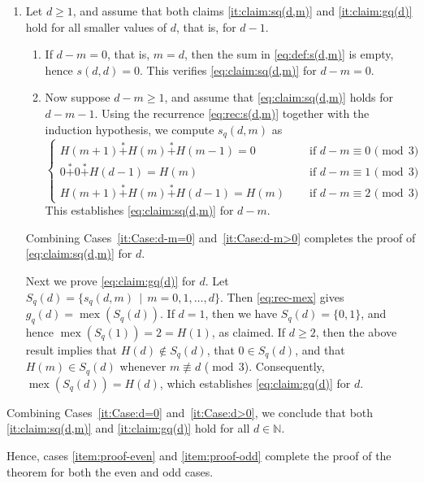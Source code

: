 \documentclass[a4paper,11pt]{amsart}
\theoremstyle{definition}
\newenvironment{demo}[1]{%
  \trivlist
  \item[\hskip\labelsep
        {\bf #1.}]
}{%
\hfill\qedsymbol
  \endtrivlist
}
\newcommand{\mex}{\operatorname{mex}}
\newcommand{\nimadd}{\overset{*}{+}}
\numberwithin{equation}{section}
\def\Non{\mathbb{N}}
\def\MOD{\operatorname{mod}}
\begin{document}
\begin{demo}{Proof of Theorem~\ref{th:Grundy-subsFF-ruler}}
\begin{enumerate}[leftmargin=14pt,label=(\roman*)]
\begin{enumerate}[label=\Roman*)]
%
Moreover, $g_{q}(0)=\mex\{s_{q}(0,0)\}=1$.
Therefore, both claims \ref{it:claim:sq(d,m)} and \ref{it:claim:gq(d)} hold for $d=0$.
%
%
\item\label{it:Case:d>0}
%
Let $d\geq1$,
and assume that both claims \ref{it:claim:sq(d,m)} and \ref{it:claim:gq(d)} 
hold for all smaller values of $d$, that is, for $d-1$.
%
\begin{enumerate}[label=\roman*)]
%
\item\label{it:Case:d-m=0}
%
If $d-m=0$, that is, $m=d$, then the sum in \eqref{eq:def:s(d,m)} is empty, hence $s(d,d)=0$.
This verifies \eqref{eq:claim:sq(d,m)} for $d-m=0$.
%
\item\label{it:Case:d-m>0}
%
Now suppose $d-m\geq1$, and assume that \eqref{eq:claim:sq(d,m)} holds for $d-m-1$.
%
Using the recurrence \eqref{eq:rec:s(d,m)} together with the induction hypothesis,
we compute $s_{q}(d,m)$ as
%
\begin{equation*}
\begin{cases}
H(m+1)\nimadd H(m)\nimadd H(m-1)=0\quad&\text{ if $d-m \equiv 0$ ($\MOD\,3$)}\\
0\nimadd 0\nimadd H(d-1)=H(m)\quad&\text{ if $d-m \equiv 1$ ($\MOD\,3$)}\\
H(m+1)\nimadd H(m)\nimadd H(d-1)=H(m)\quad&\text{ if $d-m \equiv 2$ ($\MOD\,3$)}
\end{cases}
\end{equation*}
%
This establishes \eqref{eq:claim:sq(d,m)} for $d-m$.
%
\end{enumerate}
%
Combining Cases~\ref{it:Case:d-m=0} and~\ref{it:Case:d-m>0} completes the proof of \eqref{eq:claim:sq(d,m)} for $d$.
%
\par
%
Next we prove \eqref{eq:claim:gq(d)} for $d$.
%
Let $S_{q}(d)=\{s_{q}(d,m)\,\mid\,m=0,1,\dots,d\}$.
Then \eqref{eq:rec-mex} gives $g_{q}(d)=\mex(S_{q}(d))$.
%
If $d=1$, then we have $S_{q}(d)=\{0,1\}$, and hence $\mex(S_{q}(1))=2=H(1)$, as claimed.
%
If $d\geq2$, then the above result implies that $H(d)\not\in S_{q}(d)$,
that $0\in S_{q}(d)$, 
and that $H(m)\in S_{q}(d)$ whenever $m\not\equiv d$ ($\MOD\,3$).
%
Consequently, $\mex(S_{q}(d))=H(d)$, which establishes \eqref{eq:claim:gq(d)} for $d$.
%
\end{enumerate}
%
Combining Cases~\ref{it:Case:d=0} and~\ref{it:Case:d>0},
we conclude that both \ref{it:claim:sq(d,m)} and \ref{it:claim:gq(d)} hold for all $d\in\Non$.
%
\end{enumerate} %
%
Hence, cases \ref{item:proof-even} and \ref{item:proof-odd} complete 
the proof of the theorem for both the even and odd cases.
%
\end{demo}
%
\end{document}
